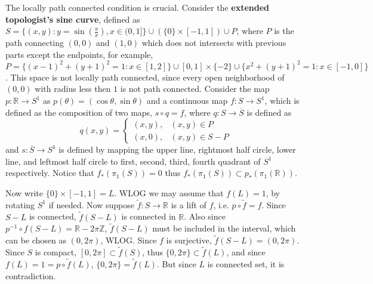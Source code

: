 \begin{exmp} The locally path connected condition is crucial. Consider the \textbf{extended topologist's sine curve}, defined as $S=\{(x,y):y=\sin\left(\frac{\pi}{x}\right),x\in (0,1]\}\cup \left(\{0\}\times [-1,1]\right)\cup P$, where $P$ is the path connecting $(0,0)$ and $(1,0)$ which does not intersects with previous parts except the endpoints, for example, $P=\{(x-1)^2+(y+1)^2=1:x\in [1,2]\}\cup [0,1]\times \{-2\}\cup \{x^2+(y+1)^2=1:x\in [-1,0]\}$. This space is not locally path connected, since every open neighborhood of $(0,0)$ with radius less then $1$ is not path connected. Consider the map $p:\mathbb{R}\rightarrow S^1$ as $p(\theta)=(\cos\theta,\sin\theta)$ and a continuous map $f:S\rightarrow S^1$, which is defined as the composition of two maps, $s\circ q=f$, where $q:S\rightarrow \overline{S}$ is defined as
\begin{equation}
q(x,y)=\begin{cases}
(x,y),&(x,y)\in P\\
(x,0),&(x,y)\in S-P
\end{cases}
\end{equation}
and $s:\overline{S}\rightarrow S^1$ is defined by mapping the upper line, rightmost half circle, lower line, and leftmost half circle to first, second, third, fourth quadrant of $S^1$ respectively. Notice that $f_*(\pi_1(S))=0$ thus $f_*(\pi_1(S))\subset p_*(\pi_1(\mathbb{R}))$.

Now write $\{0\}\times [-1,1]=L$. WLOG we may assume that $f(L)=1$, by rotating $S^1$ if needed. Now suppose $\tilde{f}:S\rightarrow \mathbb{R}$ is a lift of $f$, i.e. $p\circ \tilde{f}=f$. Since $S-L$ is connected, $\tilde{f}(S-L)$ is connected in $\mathbb{R}$. Also since $p^{-1}\circ f(S-L)=\mathbb{R}-2\pi \mathbb{Z}$, $\tilde{f}(S-L)$ must be included in the interval, which can be chosen as $(0,2\pi)$, WLOG. Since $f$ is surjective, $\tilde{f}(S-L)=(0,2\pi)$. Since $S$ is compact, $[0,2\pi]\subset \tilde{f}(S)$, thus $\{0,2\pi\}\subset \tilde{f}(L)$, and since $f(L)=1=p\circ \tilde{f}(L)$, $\{0,2\pi\}=\tilde{f}(L)$. But since $L$ is connected set, it is contradiction.
\end{exmp}

